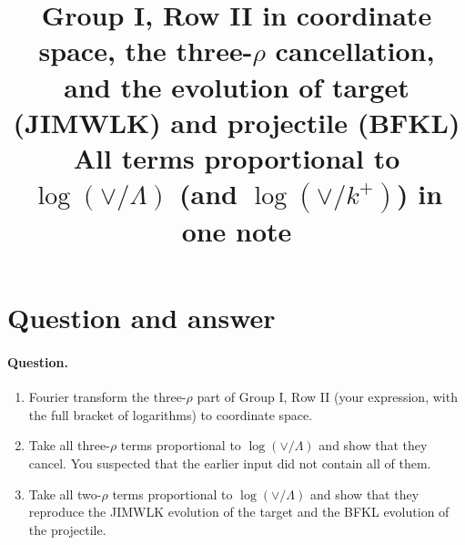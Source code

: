 \documentclass[10pt]{article}
\title{Group I, Row II in coordinate space, the three-$\rho$ cancellation,\\ and the evolution of target (JIMWLK) and projectile (BFKL)\\[4pt]
\large All terms proportional to $\log(\vee/\Lambda)$ (and $\log(\vee/k^+)$) in one note}
\date{}
\numberwithin{equation}{section}
\begin{document}
\maketitle
\tableofcontents

\section{Question and answer}\label{sec:answer}

\paragraph{Question.}
\begin{enumerate}
\item Fourier transform the three-$\rho$ part of Group I, Row II (your expression, with the full bracket of logarithms) to coordinate space.
\item Take all three-$\rho$ terms proportional to $\log(\vee/\Lambda)$ and show that they cancel. You suspected that the earlier input did not contain all of them.
\item Take all two-$\rho$ terms proportional to $\log(\vee/\Lambda)$ and show that they reproduce the JIMWLK evolution of the target and the BFKL evolution of the projectile.
\end{enumerate}
\end{document}
